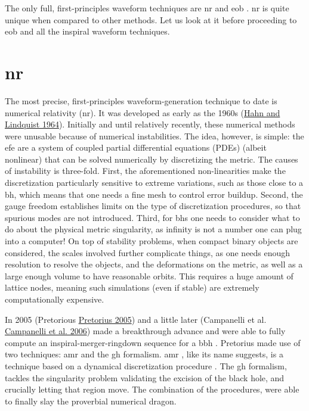 \documentclass[
  11pt,
  a4paper,
  DIV=11,
  numbers=noendperiod,
  oneside]{scrreprt}
\DeclareRobustCommand{\[}{\begin{equation}}
\DeclareRobustCommand{\]}{\end{equation}}
\begin{document}
The only full, first-principles waveform techniques are \gls{nr} and
\gls{eob} . \gls{nr} is quite unique when
compared to other methods. Let us look at it before proceeding to
\gls{eob} and all the inspiral waveform techniques.

\hypertarget{nr}{%
\section{\texorpdfstring{\acrlong{nr}}{}}\label{nr}}

The most precise, first-principles waveform-generation technique to date
is numerical relativity (\acrfull{nr}). It was developed as early as the
1960s (\protect\hyperlink{ref-hahn:1964}{Hahn and Lindquist 1964}).
Initially and until relatively recently, these numerical methods were
unusable because of numerical instabilities. The idea, however, is
simple: the \gls{efe} are a system of coupled partial differential
equations (PDEs) (albeit nonlinear) that can be solved numerically by
discretizing the metric. The causes of instability is three-fold. First,
the aforementioned non-linearities make the discretization particularly
sensitive to extreme variations, such as those close to a \gls{bh},
which means that one needs a fine mesh to control error buildup. Second,
the gauge freedom establishes limits on the type of discretization
procedures, so that spurious modes are not introduced. Third, for
\glspl{bh} one needs to consider what to do about the physical metric
singularity, as infinity is not a number one can plug into a computer!
On top of stability problems, when compact binary objects are
considered, the scales involved further complicate things, as one needs
enough resolution to resolve the objects, and the deformations on the
metric, as well as a large enough volume to have reasonable orbits. This
requires a huge amount of lattice nodes, meaning such simulations (even
if stable) are extremely computationally expensive.

In 2005 (Pretorious \protect\hyperlink{ref-Pretorius:2005gq}{Pretorius
2005}) and a little later (Campanelli et al.
\protect\hyperlink{ref-Campanelli:2005dd}{Campanelli et al. 2006}) made
a breakthrough advance and were able to fully compute an
inspiral-merger-ringdown sequence for a \gls{bbh} . Pretorius made use
of two techniques: \gls{amr} and the \gls{gh} formalism. \gls{amr} ,
like its name suggests, is a technique based on a dynamical
discretization procedure . The \gls{gh} formalism, tackles the
singularity problem validating the excision of the black hole, and
crucially letting that region move. The combination of the procedures,
were able to finally slay the proverbial numerical dragon.
\end{document}
